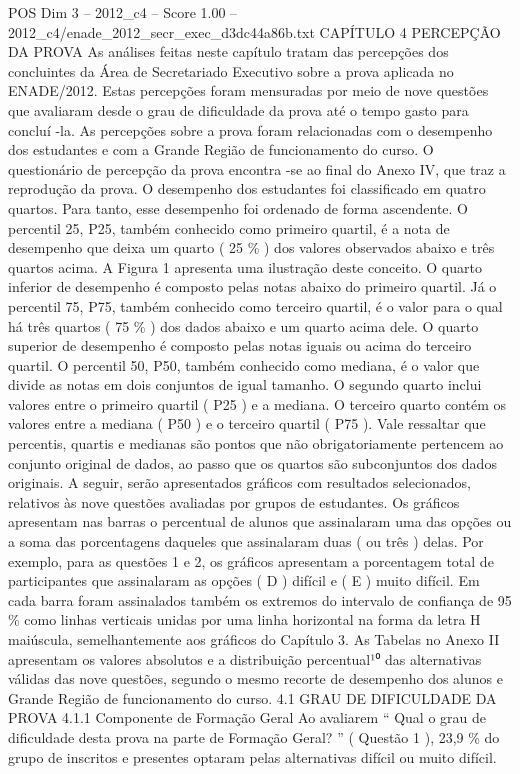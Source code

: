\begin{textsample}{POS Dim 3 – 2012\_c4 – Score 1.00 – 2012\_c4/enade\_2012\_secr\_exec\_d3dc44a86b.txt}  \label{ex:f3_pos_155}
CAPÍTULO 4 PERCEPÇÃO DA PROVA As análises feitas neste capítulo tratam das percepções dos concluintes da Área de Secretariado Executivo sobre a prova aplicada no ENADE/2012.
Estas percepções foram mensuradas por meio de nove questões que avaliaram desde o grau de dificuldade da prova até o tempo gasto para concluí -la.
As percepções sobre a prova foram relacionadas com o desempenho dos estudantes e com a Grande Região de funcionamento do curso.
O questionário de percepção da prova encontra -se ao final do Anexo IV, que traz a reprodução da prova.
O desempenho dos estudantes foi classificado em quatro quartos.
Para tanto, esse desempenho foi ordenado de forma ascendente.
O percentil 25, P25, também conhecido como primeiro quartil, é a nota de desempenho que deixa um quarto ( 25 \% ) dos valores observados abaixo e três quartos acima.
A Figura 1 apresenta uma ilustração deste conceito.
O quarto inferior de desempenho é composto pelas notas abaixo do primeiro quartil.
Já o percentil 75, P75, também conhecido como terceiro quartil, é o valor para o qual há três quartos ( 75 \% ) dos dados abaixo e um quarto acima dele.
O quarto superior de desempenho é composto pelas notas iguais ou acima do terceiro quartil.
O percentil 50, P50, também conhecido como mediana, é o valor que divide as notas em dois conjuntos de igual tamanho.
O segundo quarto inclui valores entre o primeiro quartil ( P25 ) e a mediana.
O terceiro quarto contém os valores entre a mediana ( P50 ) e o terceiro quartil ( P75 ).
Vale ressaltar que percentis, quartis e medianas são pontos que não obrigatoriamente pertencem ao conjunto original de dados, ao passo que os quartos são subconjuntos dos dados originais.
A seguir, serão apresentados gráficos com resultados selecionados, relativos às nove questões avaliadas por grupos de estudantes.
Os gráficos apresentam nas barras o percentual de alunos que assinalaram uma das opções ou a soma das porcentagens daqueles que assinalaram duas ( ou três ) delas.
Por exemplo, para as questões 1 e 2, os gráficos apresentam a porcentagem total de participantes que assinalaram as opções ( D ) difícil e ( E ) muito difícil.
Em cada barra foram assinalados também os extremos do intervalo de confiança de 95 \% como linhas verticais unidas por uma linha horizontal na forma da letra H maiúscula, semelhantemente aos gráficos do Capítulo 3.
As Tabelas no Anexo II apresentam os valores absolutos e a distribuição percentual¹⁰ das alternativas válidas das nove questões, segundo o mesmo recorte de desempenho dos alunos e Grande Região de funcionamento do curso. 4.1 GRAU DE DIFICULDADE DA PROVA 4.1.1 Componente de Formação Geral Ao avaliarem “ Qual o grau de dificuldade desta prova na parte de Formação Geral? ” ( Questão 1 ), 23,9 \% do grupo de inscritos e presentes optaram pelas alternativas difícil ou muito difícil.

\end{textsample}
